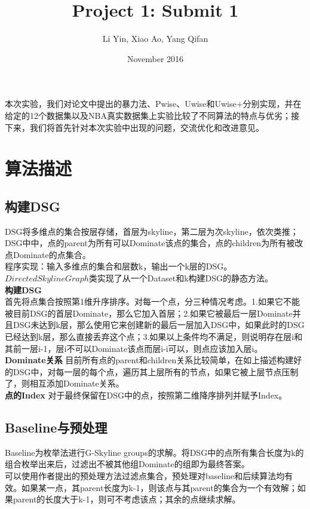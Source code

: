 \documentclass{article}
\title{Project 1: Submit 1}
\author{Li Yin, Xiao Ao, Yang Qifan}
\date{November 2016}
\begin{document}
\maketitle
\begin{CJK}{UTF8}{gbsn}  

本次实验，我们对论文中提出的暴力法、Pwise、Uwise和Uwise+分别实现，并在给定的12个数据集以及NBA真实数据集上实验比较了不同算法的特点与优劣；接下来，我们将首先针对本次实验中出现的问题，交流优化和改进意见。

\section{算法描述}

\subsection{构建DSG}
DSG将多维点的集合按层存储，首层为skyline，第二层为次skyline，依次类推；DSG中中，点的parent为所有可以Dominate该点的集合，点的children为所有被改点Dominate的点集合。\\
程序实现：输入多维点的集合和层数k，输出一个k层的DSG。$DirectedSkylineGraph$类实现了从一个Dataset和k构建DSG的静态方法。\\
\textbf{构建DSG}\\
首先将点集合按照第1维升序排序。对每一个点，分三种情况考虑。1.如果它不能被目前DSG的首层Dominate，那么它加入首层；2.如果它被最后一层Dominate并且DSG未达到k层，那么使用它来创建新的最后一层加入DSG中，如果此时的DSG已经达到k层，那么直接丢弃这个点；3.如果以上条件均不满足，则说明存在层i和其前一层i-1，层i不可以Dominate该点而层i-i可以，则点应该加入层i。\\
\textbf{Dominate关系} 目前所有点的parent和children关系比较简单，在如上描述构建好的DSG中，对每一层的每个点，遍历其上层所有的节点，如果它被上层节点压制了，则相互添加Dominate关系。\\
\textbf{点的Index}
对于最终保留在DSG中的点，按照第二维降序排列并赋予Index。
\subsection{Baseline与预处理}

Baseline为枚举法进行G-Skyline groups的求解。将DSG中的点所有集合长度为k的组合枚举出来后，过滤出不被其他组Dominate的组即为最终答案。\\
可以使用作者提出的预处理方法过滤点集合，预处理对baseline和后续算法均有效。如果某一点，其parent长度为k-1，则该点与其parent的集合为一个有效解；如果parent的长度大于k-1，则可不考虑该点；其余的点继续求解。


\end{CJK}
\end{document}
